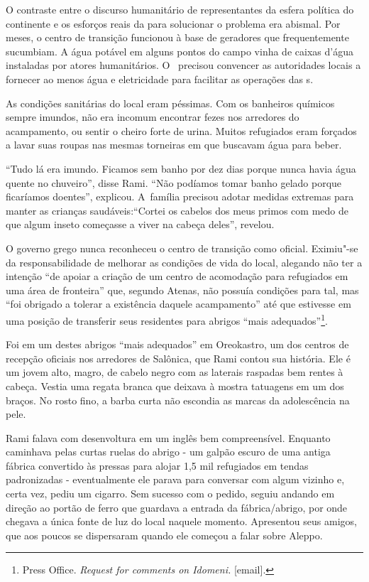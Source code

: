 O contraste entre o discurso humanitário de representantes da esfera
política do continente e os esforços reais da  para solucionar o
problema era abismal. Por meses, o centro de transição funcionou à base
de geradores que frequentemente sucumbiam. A água potável em alguns
pontos do campo vinha de caixas d'água instaladas por atores
humanitários. O~ precisou convencer as autoridades locais a fornecer
ao menos água e eletricidade para facilitar as operações das s.

As condições sanitárias do local eram péssimas. Com os banheiros
químicos sempre imundos, não era incomum encontrar fezes nos arredores
do acampamento, ou sentir o cheiro forte de urina. Muitos refugiados
eram forçados a lavar suas roupas nas mesmas torneiras em que
buscavam água para beber.

``Tudo lá era imundo. Ficamos sem banho por dez dias porque nunca havia
água quente no chuveiro'', disse Rami. ``Não podíamos tomar banho gelado
porque ficaríamos doentes'', explicou. A~família precisou adotar
medidas extremas para manter as crianças saudáveis:``Cortei os cabelos
dos meus primos com medo de que algum inseto começasse a viver na cabeça
deles'', revelou.


O governo grego nunca reconheceu o centro de transição como oficial.
Eximiu"-se da responsabilidade de melhorar as condições de vida do local,
alegando não ter a intenção ``de apoiar a criação de um centro de
acomodação para refugiados em uma área de fronteira'' que, segundo
Atenas, não possuía condições para tal, mas ``foi obrigado a tolerar a
existência daquele acampamento'' até que estivesse em uma posição de
transferir seus residentes para abrigos ``mais
adequados''\footnote{ Press Office. \emph{Request for comments on
Idomeni}\emph{.} {[}email{]}.}.

Foi em um destes abrigos ``mais adequados'' em Oreokastro, um dos
centros de recepção oficiais nos arredores de Salônica, que Rami contou
sua história. Ele é um jovem alto, magro, de cabelo negro com as
laterais raspadas bem rentes à cabeça. Vestia uma regata branca
que deixava à mostra tatuagens em um dos braços. No rosto fino, a barba
curta não escondia as marcas da adolescência na pele.

Rami falava com desenvoltura em um inglês bem compreensível. Enquanto
caminhava pelas curtas ruelas do abrigo - um galpão escuro de uma antiga
fábrica convertido às pressas para alojar 1,5 mil refugiados em tendas
padronizadas - eventualmente ele parava para conversar com algum vizinho e, certa vez, pediu um cigarro.
Sem sucesso com o pedido, seguiu andando em direção ao
portão de ferro que guardava a entrada da fábrica/abrigo, por onde
chegava a única fonte de luz do local naquele momento. Apresentou seus
amigos, que aos poucos se dispersaram quando ele começou a falar sobre
Aleppo.


